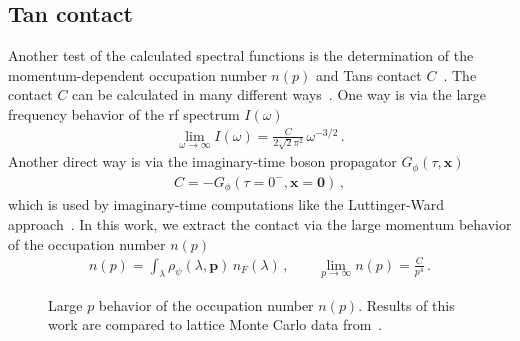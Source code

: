\subsection*{Tan contact} \label{sec:contact}

Another test of the calculated spectral functions is the determination of the momentum-dependent occupation number $n(p)$ and Tans contact $C$~\cite{Rossi2018,Jensen2020}. The contact $C$ can be calculated in many different ways~\cite{Hu2011,Palestini2010}. One way is via the large frequency behavior of the rf spectrum $I(\omega)$~\cite{Haussmann2009,Schneider2009}
%
\begin{align}
	\label{eq:rf-contact}
	\lim_{\omega\rightarrow\infty} I(\omega) = \frac{C}{2\sqrt{2}\pi^2}\,\omega^{-3/2} \,.
\end{align}
%
Another direct way is via the imaginary-time boson propagator $G_{\phi}(\tau,\bm{x})$~\cite{Rossi2018}
%
\begin{align}
	\label{eq:vertex-contact}
	C = -G_{\phi}(\tau=0^-,\bm{x}=\bm{0}) \,,
\end{align}
%
which is used by imaginary-time computations like the Luttinger-Ward approach~\cite{Frank2018}. In this work, we extract the contact via the large momentum behavior of the occupation number $n(p)$~\cite{Boettcher2012, Hu2011}
%
\begin{align}
	\label{eq:contact}
	n(p) = \int_{\lambda} \rho_{\psi}(\lambda,\bm{p})\, n_F(\lambda) \,, \qquad \lim_{p\rightarrow\infty} n(p) = \frac{C}{p^4} \,.
\end{align}
%

\begin{figure}[h]
	\centering
	\caption[Momentum distribution $n(p)$]{Large $p$ behavior of the occupation number $n(p)$. Results of this work are compared to lattice Monte Carlo data from~\cite{Bauer2023}.}
	\label{fig:momentum-density}
\end{figure}


